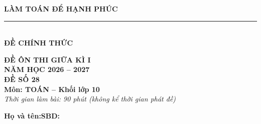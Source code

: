 \documentclass[12pt,a4paper]{article}
\begin{document}
\noindent
\begin{minipage}[c]{0.38\textwidth}
    \centering
    \textbf{LÀM TOÁN ĐỂ HẠNH PHÚC}\\[-2pt]
    \rule{3.2cm}{0.6pt}\\[3pt]
    \textbf{ĐỀ CHÍNH THỨC}
\end{minipage}\hfill
\begin{minipage}[c]{0.35\textwidth}
    \centering
    \textbf{ĐỀ ÔN THI GIỮA KÌ I}\\
    \textbf{NĂM HỌC 2026 -- 2027}\\[2pt]
    \textbf{ĐỀ SỐ 28}\\
    \textbf{Môn: TOÁN -- Khối lớp 10}\\
    \textit{\small Thời gian làm bài: 90 phút (không kể thời gian phát đề)}
\end{minipage}

\vspace{0.03cm}
\noindent
\begin{minipage}[b]{0.78\textwidth}
    \textbf{Họ và tên:}\dotfill\textbf{SBD:}\makebox[3.5cm]{\dotfill}
\end{minipage}\hfill
\begin{minipage}[b]{0.20\textwidth}
    \hfill
    \setlength{\fboxrule}{0.8pt}%
\end{minipage}
\vspace{0.03cm}
\end{document}
